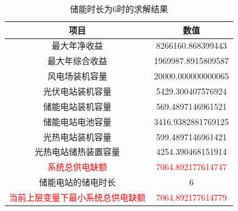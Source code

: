 \documentclass{article}
\begin{document}
\begin{table}[H]
    \centering
    \caption{储能时长为6时的求解结果}
    \label{tab:energy_system_data_6}
    \begin{tabular}{c|c}
        \toprule
        \textbf{项目} & \textbf{数值} \\
        \midrule
        最大年净收益 & 8266160.868399443 \\
        最大年综合收益 & 1969987.8915809587 \\
        风电场装机容量 & 20000.000000000065 \\
        光伏电站装机容量 & 5429.300407576924 \\
        储能电站装机容量 & 569.4897146961521 \\
        储能电站电池容量 & 3416.9382881769125 \\
        光热电站装机容量 & 599.4897146961421 \\
        光热电站储热装置容量 & 4254.390468151914 \\
        \textcolor{red}{系统总供电缺额} & \textcolor{red}{7064.892177614747} \\
        储能电站的储电时长 & 6 \\
        \textcolor{red}{当前上层变量下最小系统总供电缺额} & \textcolor{red}{7064.892177614779} \\
        \bottomrule
    \end{tabular}
\end{table}
\end{document}
